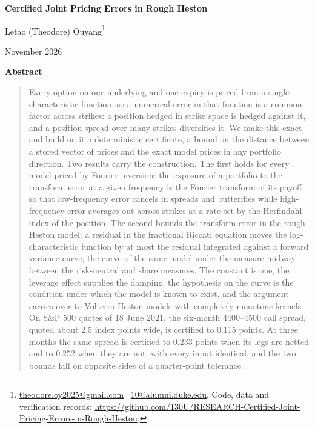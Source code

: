 \documentclass[11pt,a4paper]{article}
\begin{document}
\thispagestyle{empty}

\begin{center}

{\LARGE\bfseries Certified Joint Pricing Errors in Rough Heston\par}

\vspace{1.6em}

{\large Letao (Theodore) Ouyang\footnote{\href{mailto:theodore.oy2025@gmail.com}{theodore.oy2025@gmail.com} \textperiodcentered\ \href{mailto:10@alumni.duke.edu}{10@alumni.duke.edu}. Code, data and verification records: \url{https://github.com/130U/RESEARCH-Certified-Joint-Pricing-Errors-in-Rough-Heston}.}\par}

\vspace{0.6em}

{\normalsize November 2026\par}

\end{center}

\vspace{1.2em}

\begin{center}\textbf{Abstract}\end{center}

\begin{quote}\small{}\noindent Every option on one underlying and one expiry is priced from a single characteristic function, so a numerical error in that function is a common factor across strikes: a position hedged in strike space is hedged against it, and a position spread over many strikes diversifies it. We make this exact and build on it a deterministic certificate, a bound on the distance between a stored vector of prices and the exact model prices in any portfolio direction. Two results carry the construction. The first holds for every model priced by Fourier inversion: the exposure of a portfolio to the transform error at a given frequency is the Fourier transform of its payoff, so that low-frequency error cancels in spreads and butterflies while high-frequency error averages out across strikes at a rate set by the Herfindahl index of the position. The second bounds the transform error in the rough Heston model: a residual in the fractional Riccati equation moves the log-characteristic function by at most the residual integrated against a forward variance curve, the curve of the same model under the measure midway between the risk-neutral and share measures. The constant is one, the leverage effect supplies the damping, the hypothesis on the curve is the condition under which the model is known to exist, and the argument carries over to Volterra Heston models with completely monotone kernels. On S\&P 500 quotes of 18 June 2021, the six-month 4400–4500 call spread, quoted about 2.5 index points wide, is certified to 0.115 points. At three months the same spread is certified to 0.233 points when its legs are netted and to 0.252 when they are not, with every input identical, and the two bounds fall on opposite sides of a quarter-point tolerance.\end{quote}
\end{document}
